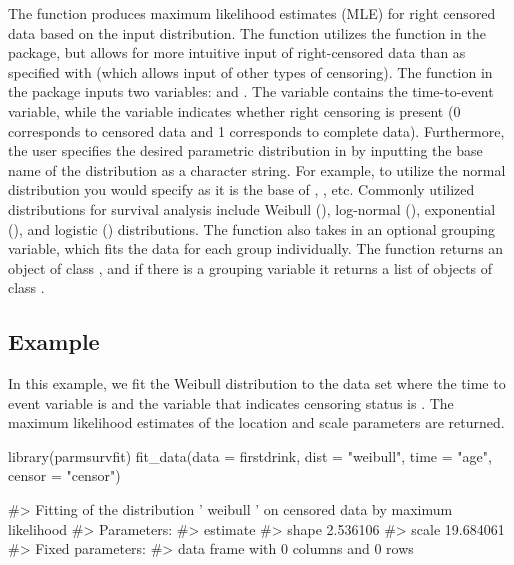 The  function produces maximum likelihood estimates
(MLE) for right censored data based on the input distribution. The
 function utilizes the  function in
the  package, but allows for more intuitive input
of right-censored data than as specified with  (which
allows input of other types of censoring). The  function
in the  package inputs two variables:  and
. The  variable contains the time-to-event
variable, while the  variable indicates whether right
censoring is present (0 corresponds to censored data and 1 corresponds
to complete data). Furthermore, the user specifies the desired
parametric distribution in  by inputting the base name of the
distribution as a character string. For example, to utilize the normal
distribution you would specify  as it is the base of
, , etc. Commonly utilized distributions for
survival analysis include Weibull (), log-normal
(), exponential (), and logistic ()
distributions. The function also takes in an optional grouping variable,
which fits the data for each group individually. The function returns an
object of class , and if there is a grouping variable
it returns a list of objects of class .

\hypertarget{example}{%
\subsection{Example}\label{example}}

In this example, we fit the Weibull distribution to the
 data set where the time to event variable is
 and the variable that indicates censoring status is
. The maximum likelihood estimates of the location and
scale parameters are returned.

\begin{Schunk}
\begin{Sinput}
library(parmsurvfit)
fit_data(data = firstdrink, dist = "weibull", time = "age", censor = "censor")
\end{Sinput}
\begin{Soutput}
#> Fitting of the distribution ' weibull ' on censored data by maximum likelihood 
#> Parameters:
#>        estimate
#> shape  2.536106
#> scale 19.684061
#> Fixed parameters:
#> data frame with 0 columns and 0 rows
\end{Soutput}
\end{Schunk}

